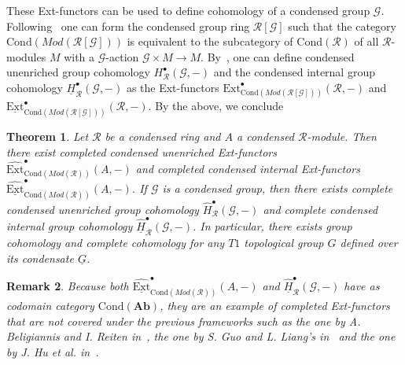 \documentclass[12pt,a4paper]{article}
\numberwithin{equation}{section}
\newtheorem{thm}{Theorem}[section]
\newtheorem{rem}[thm]{Remark}
\theoremstyle{nonumberplain}
\begin{document}
These Ext-functors can be used to define cohomology of a condensed group $\mathcal{G}$. Following~\cite[p.~2--3]{ans20} one can form the condensed group ring $\mathcal{R}[\mathcal{G}]$ such that the category $\mathrm{Cond}(Mod(\mathcal{R}[\mathcal{G}]))$ is equivalent to the subcategory of $\mathrm{Cond}(\mathcal{R})$ of all $\mathcal{R}$-modules $M$ with a $\mathcal{G}$-action $\mathcal{G} \times M \rightarrow M$. By~\cite[p.~5/8]{ans20}, one can define condensed unenriched group cohomology $H_{\mathcal{R}}^{\bullet}(\mathcal{G}, -)$ and the condensed internal group cohomology $\underline{H}_{\mathcal{R}}^{\bullet}(\mathcal{G}, -)$ as the Ext-functors $\mathrm{Ext}_{\mathrm{Cond}(Mod(\mathcal{R}[\mathcal{G}]))}^{\bullet}(\mathcal{R}, -)$ and $\underline{\mathrm{Ext}}_{\mathrm{Cond}(Mod(\mathcal{R}[\mathcal{G}]))}^{\bullet}(\mathcal{R}, -)$. By the above, we conclude

\begin{thm}\label{thm:condgroupcohom}
Let $\mathcal{R}$ be a condensed ring and $A$ a condensed $\mathcal{R}$-module. Then there exist completed condensed unenriched Ext-functors $\widehat{\mathrm{Ext}}_{\mathrm{Cond}(Mod(\mathcal{R}))}^{\bullet}(A, -)$ and completed condensed internal Ext-functors $\widehat{\underline{\mathrm{Ext}}}_{\mathrm{Cond}(Mod(\mathcal{R}))}^{\bullet}(A, -)$. If $\mathcal{G}$ is a condensed group, then there exists complete condensed unenriched group cohomology $\widehat{H}_{\mathcal{R}}^{\bullet}(\mathcal{G}, -)$ and complete condensed internal group cohomology $\widehat{\underline{H}}_{\mathcal{R}}^{\bullet}(\mathcal{G}, -)$. In particular, there exists group cohomology and complete cohomology for any $T1$ topological group $G$ defined over its condensate $\underline{G}$.
\end{thm}

\begin{rem}\label{rem:differencetoguoliang}
Because both $\widehat{\underline{\mathrm{Ext}}}_{\mathrm{Cond}(Mod(\mathcal{R}))}^{\bullet}(A, -)$ and $\widehat{\underline{H}}_{\mathcal{R}}^{\bullet}(\mathcal{G}, -)$ have as codomain category $\mathrm{Cond}(\mathbf{Ab})$, they are an example of completed Ext-functors that are not covered under the previous frameworks such as the one by A.\! Beligiannis and I.\! Reiten in~\cite{bel07}, the one by S.\! Guo and L.\! Liang's in~\cite{guo23} and the one by J.\! Hu et al.\! in~\cite{hu21}.
\end{rem}
\end{document}
